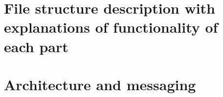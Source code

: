 \section{File structure description with explanations of functionality of each part}
\section{Architecture and messaging}





